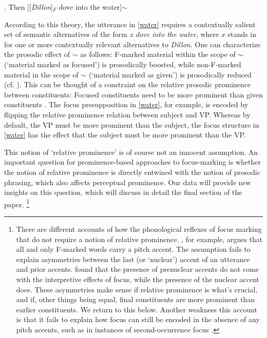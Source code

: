 \documentclass[preprint,review,12pt,authoryear,times]{elsarticle}
\begin{document}
\ex. Then [[{\em Dillon}]$_F$ dove into the water]$\sim$\label{waterFoc}

According to this theory, the utterance in \ref{water} requires a contextually salient set of semantic alternatives of the form  {\em x dove into the water}, where $x$ stands in for one or more contextually relevant alternatives to {\em Dillon}. One can characterize the prosodic effect of $\sim$ as follows: F-marked material within the scope of $\sim$ (`material marked as focused') is prosodically boosted, while non-F-marked material in the scope of $\sim$ (`material marked as given') is prosodically reduced  (cf. \citealt{rooth92b,truck95}). This can be thought of a constraint on  the relative prosodic prominence between constituents: Focused constituents need to be more prominent than given constituents \citep[cf.][]{willi97,  szend03, wagner05recursion, reinh06, burin16b}. The focus presupposition in \ref{water}, for example, is encoded by flipping the relative prominence relation between subject and VP. Whereas by default, the VP must be more prominent than the subject, the focus structure in \ref{water} has the effect that the subject must be more prominent than the VP. 

This notion of `relative prominence' is of course not an innocent assumption. An important question for prominence-based approaches to focus-marking is whether the notion of relative prominence is directly entwined with the notion of prosodic phrasing, which also affects perceptual prominence. Our data will provide new insights on this question, which will discuss in detail the final section of the paper. 
\footnote{There are different accounts of how the phonological reflexes of focus marking that do not require a notion of relative prominence.  \citet{schwa99}, for example, argues that all and only F-marked words carry a pitch accent. The assumption fails to explain asymmetries between the last (or `nuclear') accent of an utterance and prior accents. \citet{welby03} found that the presence of prenuclear accents do not come with the interpretive effects of focus, while the presence of the nuclear accent does. These asymmetries make sense if relative prominence is what's crucial, and if, other things being equal, final constituents are more prominent than earlier constituents. We return to this below. Another weakness this account is that it fails to explain how focus can still be encoded in the absence of any pitch accents, such as in instances of second-occurrence focus \citep{burin16b,bauma16}.}
\end{document}

